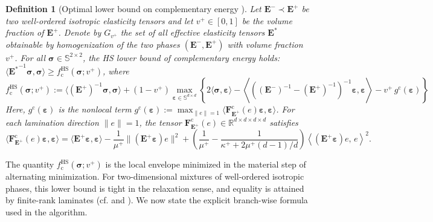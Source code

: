 \documentclass[preprint,3p]{elsarticle}
\newcommand{\tens}[1]{\bm{\mathit{#1}}}             %
\newcommand{\tenss}[1]{\bm{\mathbf{#1}}}            %
\newcommand{\tensf}[1]{\bm{\mathbf{#1}}}            %
\newcommand{\strain}{\tenss{\varepsilon}}           %
\newcommand{\stress}{\tenss{\sigma}}                %
\newcommand{\Emin}{\tensf{E}^{-}}                   %
\newcommand{\Emax}{\tensf{E}^{+}}                   %
\newcommand{\Estar}{\tensf{E}^{*}}
\newtheorem{definition}{Definition}[section]
\begin{document}
\begin{definition}[Optimal lower bound on complementary energy {\citep[Definition~2.3.15]{Allaire2002}}]
    Let $\Emin \prec \Emax$ be two well-ordered isotropic elasticity tensors and let $v^+\in[0,1]$ be the volume fraction of $\Emax$. Denote by $G_{v^+}$ the set of all effective elasticity tensors $\Estar$ obtainable by homogenization of the two phases $(\Emin,\Emax)$ with volume fraction $v^+$.
    For all $\stress\in\mathbb{S}^{2\times 2}$, the HS lower bound of complementary energy holds:
    $\langle {\Estar}^{-1}\stress,\stress\rangle\geq f_{\mathrm{c}}^{\mathrm{HS}}(\stress;v^+)$, where 
    \begin{equation}
        f_{\mathrm{c}}^{\mathrm{HS}}(\stress;v^+):=\langle (\Emax)^{-1}\stress,\stress\rangle+(1-v^+)\max_{\strain\in\mathbb{S}^{d\times d}}\left\{ 2\langle\stress,\strain\rangle
        - \left\langle\left((\Emin)^{-1}-(\Emax)^{-1}\right)^{-1}\strain,\strain\right\rangle - v^+\, g^{\mathrm{c}}(\strain)\right\}
    \end{equation}
    Here, $g^\mathrm{c}(\strain)$ is the nonlocal term
    $g^{\mathrm{c}}(\strain):=\max_{\lVert\tens{e}\rVert=1}\langle \tensf{F}^{\mathrm{c}}_{\Emax}(\tens{e})\strain,\strain\rangle$. For each lamination direction $\lVert\tens{e}\rVert=1$, the tensor $\tensf{F}^{\mathrm{c}}_{\Emax}(\tens{e})\in\mathbb{R}^{d\times d\times d\times d}$ satisfies
    \begin{equation}
         \langle \tensf{F}_{\Emax}^\mathrm{c}(\tens{e})\strain,\strain\rangle = \langle \Emax\strain,\strain\rangle-\frac{1}{\mu^+}\lVert(\Emax\strain)\tens{e}\rVert^2+
    \left(\frac{1}{\mu^+} - \frac{1}{\kappa^+ + 2 \mu^+ (d - 1)/d}\right)
    \left\langle (\Emax\strain)\tens{e},\, \tens{e}\right\rangle^2. 
    \end{equation}
\end{definition}

The quantity $f_{\mathrm{c}}^{\mathrm{HS}}(\stress;v^+)$ is the local envelope minimized in the material step of alternating minimization. For two-dimensional mixtures of well-ordered isotropic phases, this lower bound is tight in the relaxation sense, and equality is attained by finite-rank laminates (cf. \citep[Proposition~2.3.25]{Allaire2002} and \citep[Theorem~2]{Burazin2021}). We now state the explicit branch-wise formula used in the algorithm.
\end{document}
